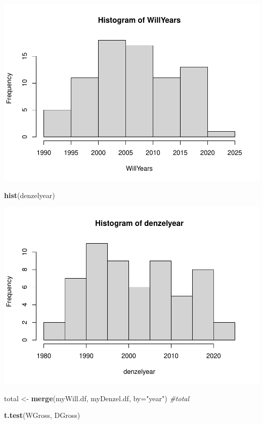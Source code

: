 \documentclass[]{article}
\newenvironment{Shaded}{\begin{snugshade}}{\end{snugshade}}
\newcommand{\CommentTok}[1]{\textcolor[rgb]{0.56,0.35,0.01}{\textit{#1}}}
\newcommand{\DataTypeTok}[1]{\textcolor[rgb]{0.13,0.29,0.53}{#1}}
\newcommand{\KeywordTok}[1]{\textcolor[rgb]{0.13,0.29,0.53}{\textbf{#1}}}
\newcommand{\NormalTok}[1]{#1}
\newcommand{\StringTok}[1]{\textcolor[rgb]{0.31,0.60,0.02}{#1}}
\begin{document}
\includegraphics{Denzel-v-Will-data_files/figure-latex/unnamed-chunk-7-3.pdf}

\begin{Shaded}
\begin{Highlighting}[]
\KeywordTok{hist}\NormalTok{(denzelyear)}
\end{Highlighting}
\end{Shaded}

\includegraphics{Denzel-v-Will-data_files/figure-latex/unnamed-chunk-7-4.pdf}

\begin{Shaded}
\begin{Highlighting}[]
\NormalTok{total \textless{}{-}}\StringTok{ }\KeywordTok{merge}\NormalTok{(myWill.df, myDenzel.df, }\DataTypeTok{by=}\StringTok{"year"}\NormalTok{)}
\CommentTok{\#total}

\KeywordTok{t.test}\NormalTok{(WGross, DGross)}
\end{Highlighting}
\end{Shaded}
\end{document}
